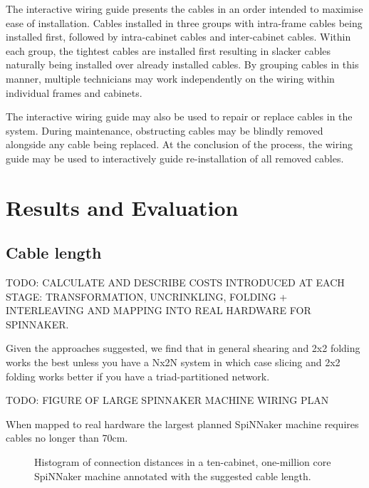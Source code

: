 			The interactive wiring guide presents the cables in an order intended to
			maximise ease of installation. Cables installed in three groups with
			intra-frame cables being installed first, followed by intra-cabinet
			cables and inter-cabinet cables. Within each group, the tightest cables
			are installed first resulting in slacker cables naturally being installed
			over already installed cables. By grouping cables in this manner,
			multiple technicians may work independently on the wiring within
			individual frames and cabinets.
			
			The interactive wiring guide may also be used to repair or replace cables
			in the system. During maintenance, obstructing cables may be blindly
			removed alongside any cable being replaced. At the conclusion of the
			process, the wiring guide may be used to interactively guide
			re-installation of all removed cables.
	
	\section{Results and Evaluation}
		
		\subsection{Cable length}
			
			TODO: CALCULATE AND DESCRIBE COSTS INTRODUCED AT EACH STAGE:
			TRANSFORMATION, UNCRINKLING, FOLDING + INTERLEAVING AND MAPPING INTO REAL
			HARDWARE FOR SPINNAKER.
			
			Given the approaches suggested, we find that in general shearing and 2x2
			folding works the best unless you have a Nx2N system in which case
			slicing and 2x2 folding works better if you have a triad-partitioned
			network.
			
			TODO: FIGURE OF LARGE SPINNAKER MACHINE WIRING PLAN
			
			When mapped to real hardware the largest planned SpiNNaker machine
			requires cables no longer than 70cm.
			
			\begin{figure}
				
				\center
				
				\caption{Histogram of connection distances in a ten-cabinet,
				one-million core SpiNNaker machine annotated with the suggested cable
				length.}
				\label{fig:wire-length-histogram}
				
			\end{figure}
			
